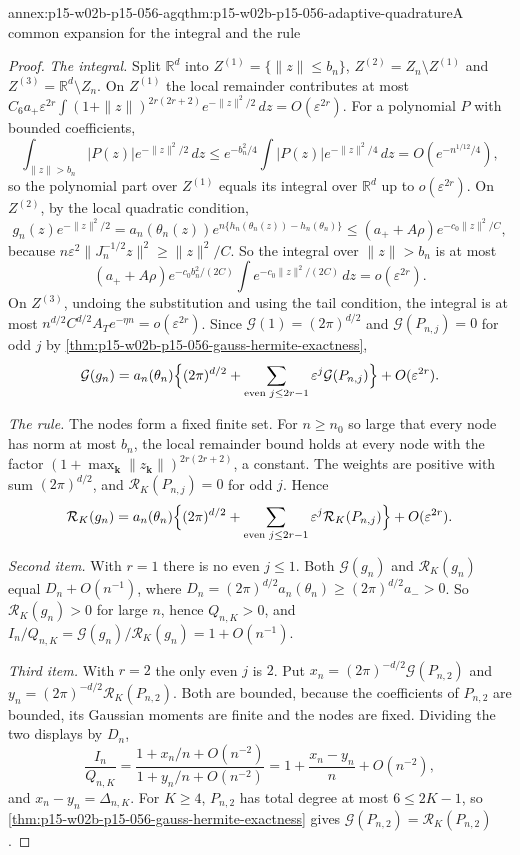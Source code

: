 \begin{annexitem}{annex:p15-w02b-p15-056-agq}{thm:p15-w02b-p15-056-adaptive-quadrature}{A common expansion for the integral and the rule}
\begin{proof}
\emph{The integral.} Split \(\mathbb R^d\) into
\(Z^{(1)}=\{\|z\|\leq b_n\}\), \(Z^{(2)}=Z_n\setminus Z^{(1)}\) and
\(Z^{(3)}=\mathbb R^d\setminus Z_n\). On \(Z^{(1)}\) the local remainder
contributes at most
\(C_6a_+\varepsilon^{2r}\int(1+\|z\|)^{2r(2r+2)}e^{-\|z\|^2/2}\,dz
=O(\varepsilon^{2r})\). For a polynomial \(P\) with bounded coefficients,
\[
 \int_{\|z\|>b_n}|P(z)|e^{-\|z\|^2/2}\,dz
 \leq e^{-b_n^2/4}\int|P(z)|e^{-\|z\|^2/4}\,dz=O(e^{-n^{1/12}/4}),
\]
so the polynomial part over \(Z^{(1)}\) equals its integral over
\(\mathbb R^d\) up to \(o(\varepsilon^{2r})\). On \(Z^{(2)}\), by the
local quadratic condition,
\[
 g_n(z)e^{-\|z\|^2/2}=a_n(\theta_n(z))e^{n\{h_n(\theta_n(z))-h_n(\theta_n)\}}
 \leq(a_++A\rho)e^{-c_0\|z\|^2/C},
\]
because \(n\varepsilon^2\|J_n^{-1/2}z\|^2\geq\|z\|^2/C\). So the integral
over \(\|z\|>b_n\) is at most
\[
 (a_++A\rho)e^{-c_0b_n^2/(2C)}\int e^{-c_0\|z\|^2/(2C)}\,dz
 =o(\varepsilon^{2r}).
\]
On \(Z^{(3)}\), undoing the substitution and using the tail condition,
the integral is at most \(n^{d/2}C^{d/2}A_Te^{-\eta n}=o(\varepsilon^{2r})\).
Since \(\mathcal G(1)=(2\pi)^{d/2}\) and \(\mathcal G(P_{n,j})=0\) for odd
\(j\) by \cref{thm:p15-w02b-p15-056-gauss-hermite-exactness},
\[
 \mathcal G(g_n)=a_n(\theta_n)\Bigl\{(2\pi)^{d/2}
 +\sum_{\text{even }j\leq2r-1}\varepsilon^j\mathcal G(P_{n,j})\Bigr\}
 +O(\varepsilon^{2r}).
\]

\emph{The rule.} The nodes form a fixed finite set. For \(n\geq n_0\) so
large that every node has norm at most \(b_n\), the local remainder
bound holds at every node with the factor
\((1+\max_{\mathbf k}\|z_{\mathbf k}\|)^{2r(2r+2)}\), a constant. The
weights are positive with sum \((2\pi)^{d/2}\), and
\(\mathcal R_K(P_{n,j})=0\) for odd \(j\). Hence
\[
 \mathcal R_K(g_n)=a_n(\theta_n)\Bigl\{(2\pi)^{d/2}
 +\sum_{\text{even }j\leq2r-1}\varepsilon^j\mathcal R_K(P_{n,j})\Bigr\}
 +O(\varepsilon^{2r}).
\]

\emph{Second item.} With \(r=1\) there is no even \(j\leq1\). Both
\(\mathcal G(g_n)\) and \(\mathcal R_K(g_n)\) equal
\(D_n+O(n^{-1})\), where \(D_n=(2\pi)^{d/2}a_n(\theta_n)\geq(2\pi)^{d/2}a_->0\).
So \(\mathcal R_K(g_n)>0\) for large \(n\), hence \(Q_{n,K}>0\), and
\(I_n/Q_{n,K}=\mathcal G(g_n)/\mathcal R_K(g_n)=1+O(n^{-1})\).

\emph{Third item.} With \(r=2\) the only even \(j\) is \(2\). Put
\(x_n=(2\pi)^{-d/2}\mathcal G(P_{n,2})\) and
\(y_n=(2\pi)^{-d/2}\mathcal R_K(P_{n,2})\). Both are bounded, because the
coefficients of \(P_{n,2}\) are bounded, its Gaussian moments are finite
and the nodes are fixed. Dividing the two displays by \(D_n\),
\[
 \frac{I_n}{Q_{n,K}}=\frac{1+x_n/n+O(n^{-2})}{1+y_n/n+O(n^{-2})}
 =1+\frac{x_n-y_n}n+O(n^{-2}),
\]
and \(x_n-y_n=\Delta_{n,K}\). For \(K\geq4\), \(P_{n,2}\) has total degree
at most \(6\leq2K-1\), so
\cref{thm:p15-w02b-p15-056-gauss-hermite-exactness} gives
\(\mathcal G(P_{n,2})=\mathcal R_K(P_{n,2})\).


\end{proof}
\end{annexitem}
